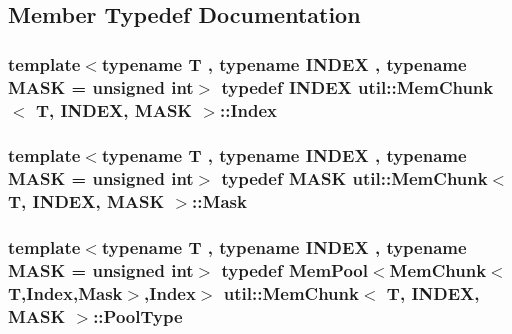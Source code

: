 \subsection{Member Typedef Documentation}
\hypertarget{structutil_1_1MemChunk_a4f05352eb1c778a4791abe24d912b837}{
\subsubsection[{Index}]{\setlength{\rightskip}{0pt plus 5cm}template$<$typename T , typename I\-N\-D\-E\-X , typename M\-A\-S\-K  = unsigned int$>$ typedef I\-N\-D\-E\-X {\bf util\-::\-Mem\-Chunk}$<$ T, I\-N\-D\-E\-X, M\-A\-S\-K $>$\-::{\bf Index}}}\label{structutil_1_1MemChunk_a4f05352eb1c778a4791abe24d912b837}
\hypertarget{structutil_1_1MemChunk_a4ebe426d4977c2a9d95307cca65e3874}{
\subsubsection[{Mask}]{\setlength{\rightskip}{0pt plus 5cm}template$<$typename T , typename I\-N\-D\-E\-X , typename M\-A\-S\-K  = unsigned int$>$ typedef M\-A\-S\-K {\bf util\-::\-Mem\-Chunk}$<$ T, I\-N\-D\-E\-X, M\-A\-S\-K $>$\-::{\bf Mask}}}\label{structutil_1_1MemChunk_a4ebe426d4977c2a9d95307cca65e3874}
\hypertarget{structutil_1_1MemChunk_afd8dc8a7c608cfcaca89df49e5ff084b}{
\subsubsection[{Pool\-Type}]{\setlength{\rightskip}{0pt plus 5cm}template$<$typename T , typename I\-N\-D\-E\-X , typename M\-A\-S\-K  = unsigned int$>$ typedef {\bf Mem\-Pool}$<${\bf Mem\-Chunk}$<$T,{\bf Index},{\bf Mask}$>$,{\bf Index}$>$ {\bf util\-::\-Mem\-Chunk}$<$ T, I\-N\-D\-E\-X, M\-A\-S\-K $>$\-::{\bf Pool\-Type}}}\label{structutil_1_1MemChunk_afd8dc8a7c608cfcaca89df49e5ff084b}



